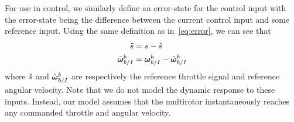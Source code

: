 For use in control, we similarly define an error-state for the control input
with the error-state being the difference between the current control input and
some reference input.
Using the same definition as in~\eqref{eq:error}, we can see that
\begin{align}
  \tilde{s} &= s - \check{s} \\
  \tilde{\boldsymbol{\mathrm{\omega}}}_{b/I}^{b} &= \boldsymbol{\mathrm{\omega}}_{b/I}^{b} - \check{\boldsymbol{\mathrm{\omega}}}_{b/I}^{b}
  \label{eq:input_error_state}
\end{align}
where $\check{s}$ and $\check{\boldsymbol{\mathrm{\omega}}}_{b/I}^{b}$ are respectively the reference throttle
signal and reference angular velocity. Note that we do not model the dynamic
response to these inputs. Instead, our model assumes that the multirotor
instantaneously reaches any commanded throttle and angular velocity.

